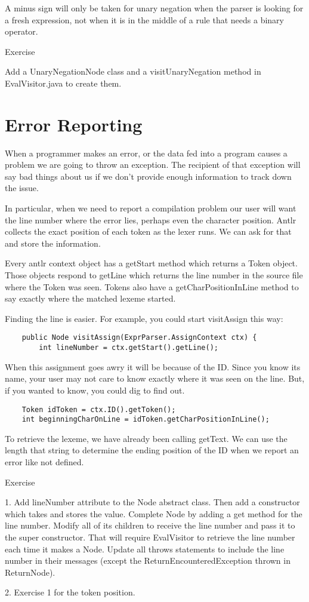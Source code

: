 A minus sign will only be taken for unary negation when the parser is
looking for a fresh expression, not when it is in the middle of a rule
that needs a binary operator.

Exercise

Add a UnaryNegationNode class and a visitUnaryNegation method in
EvalVisitor.java to create them.

\section{Error Reporting}

When a programmer makes an error, or the data fed into a program causes
a problem we are going to throw an exception. The recipient of that
exception will say bad things about us if we don't provide enough
information to track down the issue.

In particular, when we need to report a compilation problem our user
will want the line number where the error lies, perhaps even the character
position. Antlr collects the exact position of each token as the lexer
runs. We can ask for that and store the information.

Every antlr context object has a getStart method which returns a Token
object. Those objects respond to getLine which returns the line number
in the source file where the Token was seen. Tokens also have a
getCharPositionInLine method to say exactly where the matched lexeme
started.

Finding the line is easier. For example, you could start visitAssign this way:

{\footnotesize
\begin{verbatim}
    public Node visitAssign(ExprParser.AssignContext ctx) {
        int lineNumber = ctx.getStart().getLine();
\end{verbatim}
    }

When this assignment goes awry it will be because of the ID. Since you know its
name, your user may not care to know exactly where it was seen on the line.
But, if you wanted to know, you could dig to find out.

{\footnotesize
\begin{verbatim}
    Token idToken = ctx.ID().getToken();
    int beginningCharOnLine = idToken.getCharPositionInLine();
\end{verbatim}
}

To retrieve the lexeme, we have already been calling getText. We can use
the length that string to determine the ending position of the ID when we
report an error like not defined.

Exercise

1. Add lineNumber attribute to the Node abstract class. Then add a constructor
   which takes and stores the value. Complete Node by adding a get method for
   the line number. Modify all of its children to receive the line number and
   pass it to the super constructor. That will require EvalVisitor to retrieve
   the line number each time it makes a Node.
   Update all throws statements to include the line number in their messages
   (except the ReturnEncounteredException thrown in ReturnNode).

2. Exercise 1 for the token position.

